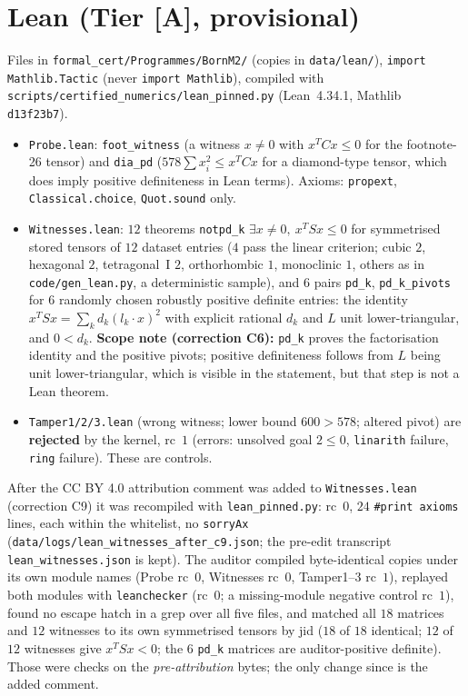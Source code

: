 \documentclass[10pt]{article}
\newcommand{\tier}[1]{\textsf{[#1]}}
\newcommand{\tA}{\tier{A}}
\newcommand{\lean}[1]{\texttt{#1}}
\begin{document}
\section{Lean (Tier \tA{}, provisional)}\label{sec:lean}
Files in \texttt{formal\_cert/Programmes/BornM2/} (copies in \texttt{data/lean/}), \texttt{import Mathlib.Tactic} (never \texttt{import Mathlib}), compiled with \texttt{scripts/certified\_numerics/lean\_pinned.py} (Lean~4.34.1, Mathlib \texttt{d13f23b7}).
\begin{itemize}\itemsep=1pt
\item \texttt{Probe.lean}: \lean{foot\_witness} (a witness $x\ne0$ with $x^TCx\le0$ for the footnote-26 tensor) and \lean{dia\_pd} ($578\sum x_i^2\le x^TCx$ for a diamond-type tensor, which does imply positive definiteness in Lean terms). Axioms: \lean{propext}, \lean{Classical.choice}, \lean{Quot.sound} only.
\item \texttt{Witnesses.lean}: $12$ theorems \lean{notpd\_k} $\exists x\ne0,\ x^TSx\le0$ for symmetrised stored tensors of $12$ dataset entries ($4$ pass the linear criterion; cubic $2$, hexagonal $2$, tetragonal~I $2$, orthorhombic $1$, monoclinic $1$, others as in \texttt{code/gen\_lean.py}, a deterministic sample), and $6$ pairs \lean{pd\_k}, \lean{pd\_k\_pivots} for $6$ randomly chosen robustly positive definite entries: the identity $x^TSx=\sum_kd_k(l_k\cdot x)^2$ with explicit rational $d_k$ and $L$ unit lower-triangular, and $0<d_k$. \textbf{Scope note (correction C6):} \lean{pd\_k} proves the factorisation identity and the positive pivots; positive definiteness follows from $L$ being unit lower-triangular, which is visible in the statement, but that step is not a Lean theorem.
\item \texttt{Tamper1/2/3.lean} (wrong witness; lower bound $600>578$; altered pivot) are \textbf{rejected} by the kernel, rc~$1$ (errors: unsolved goal $2\le0$, \texttt{linarith} failure, \texttt{ring} failure). These are controls.
\end{itemize}
After the CC BY 4.0 attribution comment was added to \texttt{Witnesses.lean} (correction C9) it was recompiled with \texttt{lean\_pinned.py}: rc~$0$, $24$ \texttt{\#print axioms} lines, each within the whitelist, no \lean{sorryAx} (\texttt{data/logs/lean\_witnesses\_after\_c9.json}; the pre-edit transcript \texttt{lean\_witnesses.json} is kept). The auditor compiled byte-identical copies under its own module names (Probe rc~$0$, Witnesses rc~$0$, Tamper1--3 rc~$1$), replayed both modules with \texttt{leanchecker} (rc~$0$; a missing-module negative control rc~$1$), found no escape hatch in a grep over all five files, and matched all $18$ matrices and $12$ witnesses to its own symmetrised tensors by jid ($18$ of $18$ identical; $12$ of $12$ witnesses give $x^TSx<0$; the $6$ \lean{pd\_k} matrices are auditor-positive definite). Those were checks on the \emph{pre-attribution} bytes; the only change since is the added comment.
\end{document}
